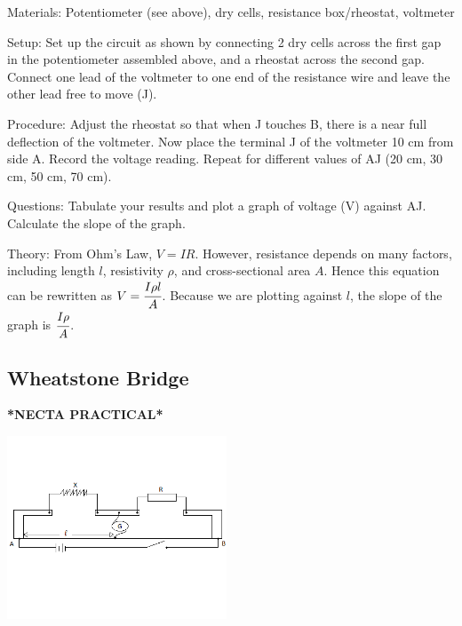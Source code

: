 \begin{multicols}{2}
\begin{description*}
\item[Materials:]{Potentiometer (see above), dry cells, resistance box/rheostat, voltmeter}
\item[Setup:]{Set up the circuit as shown by connecting 2 dry cells across the first gap in the potentiometer assembled above, and a rheostat across the second gap. Connect one lead of the voltmeter to one end of the resistance wire and leave the other lead free to move (J).}
\item[Procedure:]{Adjust the rheostat so that when J touches B, there is a near full deflection of the voltmeter. Now place the terminal J of the voltmeter 10 cm from side A. Record the voltage reading. Repeat for different values of AJ (20 cm, 30 cm, 50 cm, 70 cm).}
\item[Questions:]{Tabulate your results and plot a graph of voltage (V) against AJ. Calculate the slope of the graph.}
\item[Theory:]{From Ohm's Law, $V = IR$. However, resistance depends on many factors, including length $l$, resistivity $\rho$, and cross-sectional area $A$. Hence this equation can be rewritten as $V = \cfrac{I \rho l}{A}$. Because we are plotting against $l$, the slope of the graph is $\cfrac{I \rho}{A}$.}
\end{description*}

\subsection{Wheatstone Bridge}
\textbf{*NECTA PRACTICAL*}

\begin{center}
\includegraphics[width=0.49\textwidth]{./img/metre-bridge-assembly.png}
\end{center}


\end{multicols}

